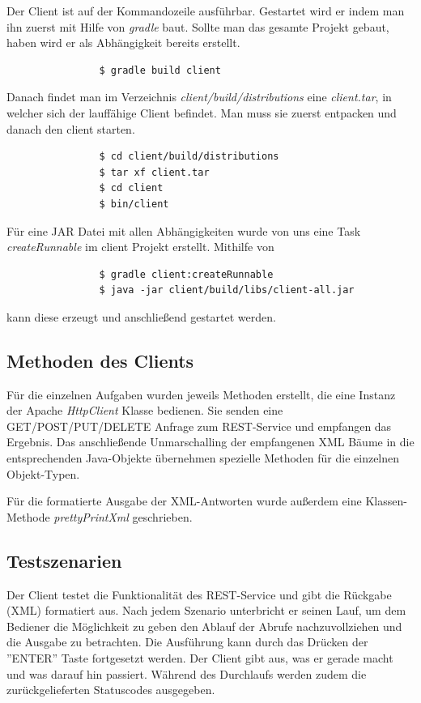\documentclass[12pt]{scrartcl}
\begin{document}
			Der Client ist auf der Kommandozeile ausführbar. Gestartet wird er indem man ihn zuerst mit Hilfe von \emph{gradle} baut. Sollte man das gesamte Projekt gebaut, haben wird er als Abhängigkeit bereits erstellt.
			\begin{verbatim}
				$ gradle build client
			\end{verbatim}
			
			Danach findet man im Verzeichnis \emph{client/build/distributions} eine \emph{client.tar}, in welcher sich der lauffähige Client befindet. Man muss sie zuerst entpacken und danach den client starten.
			
			\begin{verbatim}
				$ cd client/build/distributions
				$ tar xf client.tar
				$ cd client
				$ bin/client
			\end{verbatim}
			
			Für eine JAR Datei mit allen Abhängigkeiten wurde von uns eine Task \emph{createRunnable} im client Projekt erstellt. Mithilfe von
			\begin{verbatim}
				$ gradle client:createRunnable
				$ java -jar client/build/libs/client-all.jar
			\end{verbatim}
			
			kann diese erzeugt und anschließend gestartet werden.
		\subsection{Methoden des Clients}
		
			Für die einzelnen Aufgaben wurden jeweils Methoden erstellt, die eine Instanz der Apache \emph{HttpClient} Klasse bedienen. Sie senden eine GET/POST/PUT/DELETE Anfrage zum REST-Service und empfangen das Ergebnis. Das anschließende Unmarschalling der empfangenen XML Bäume in die entsprechenden Java-Objekte übernehmen spezielle Methoden für die einzelnen Objekt-Typen.
			
			Für die formatierte Ausgabe der XML-Antworten wurde außerdem eine Klassen-Methode \emph{prettyPrintXml} geschrieben.
		
		
		\subsection{Testszenarien}
			
			Der Client testet die Funktionalität des REST-Service und gibt die Rückgabe (XML) formatiert aus. Nach jedem Szenario unterbricht er seinen Lauf, um dem Bediener die Möglichkeit zu geben den Ablauf der Abrufe nachzuvollziehen und die Ausgabe zu betrachten. Die Ausführung kann durch das Drücken der ''ENTER'' Taste fortgesetzt werden. Der Client gibt aus, was er gerade macht und was darauf hin passiert. Während des Durchlaufs werden zudem die zurückgelieferten Statuscodes ausgegeben.
			
\end{document}
